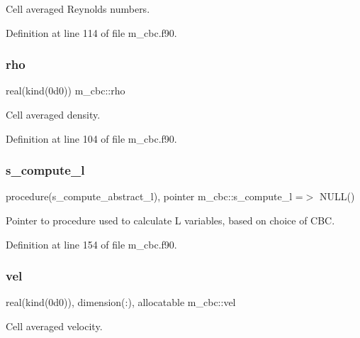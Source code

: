 Cell averaged Reynolds numbers. 



Definition at line 114 of file m\+\_\+cbc.\+f90.

\mbox{\label{namespacem__cbc_afece2e0a449e76d45bd85eeec0207ce8}} 
\subsubsection{\texorpdfstring{rho}{rho}}
{\footnotesize\ttfamily real(kind(0d0)) m\+\_\+cbc\+::rho}



Cell averaged density. 



Definition at line 104 of file m\+\_\+cbc.\+f90.

\mbox{\label{namespacem__cbc_a6ba3d055b8d3c0d003ff74ccd2762b1c}} 
\subsubsection{\texorpdfstring{s\+\_\+compute\+\_\+l}{s\_compute\_l}}
{\footnotesize\ttfamily procedure(s\+\_\+compute\+\_\+abstract\+\_\+l), pointer m\+\_\+cbc\+::s\+\_\+compute\+\_\+l =$>$ N\+U\+LL()}



Pointer to procedure used to calculate L variables, based on choice of C\+BC. 



Definition at line 154 of file m\+\_\+cbc.\+f90.

\mbox{\label{namespacem__cbc_ad80b730485604931948331f36eb7b6e2}} 
\subsubsection{\texorpdfstring{vel}{vel}}
{\footnotesize\ttfamily real(kind(0d0)), dimension(\+:), allocatable m\+\_\+cbc\+::vel}



Cell averaged velocity. 



